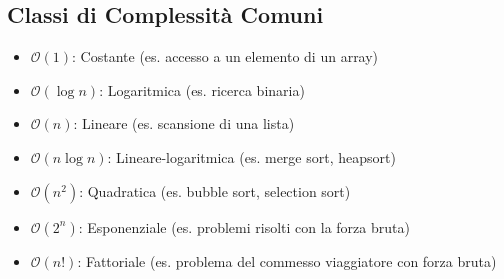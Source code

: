 \subsection*{Classi di Complessità Comuni}
\begin{itemize}
    \item $\mathcal{O}(1)$: Costante (es. accesso a un elemento di un array)
    \item $\mathcal{O}(\log n)$: Logaritmica (es. ricerca binaria)
    \item $\mathcal{O}(n)$: Lineare (es. scansione di una lista)
    \item $\mathcal{O}(n \log n)$: Lineare-logaritmica (es. merge sort, heapsort)
    \item $\mathcal{O}(n^2)$: Quadratica (es. bubble sort, selection sort)
    \item $\mathcal{O}(2^n)$: Esponenziale (es. problemi risolti con la forza bruta)
    \item $\mathcal{O}(n!)$: Fattoriale (es. problema del commesso viaggiatore con forza bruta)
\end{itemize}